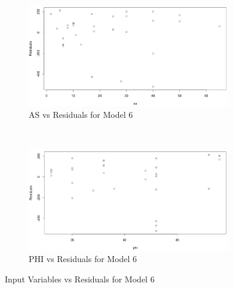 \documentclass[a4paper,12pt, english]{article}
\begin{document}
\begin{figure}[H]
        \centering
        \begin{subfigure}[b]{0.85\textwidth}
                \includegraphics[width=0.96986\textwidth]{mod6-resid1}
   		 \caption{AS vs Residuals for Model 6}
  		\label{fig:mod6-resid1}
        \end{subfigure}%
        ~ %
        
        \begin{subfigure}[b]{0.85\textwidth}
                \centering
  		\includegraphics[width=0.96986\textwidth]{mod6-resid2}
  		\caption{PHI vs Residuals for Model 6}
  		\label{fig:mod6-resid2}
        \end{subfigure}
        
        \caption{Input Variables vs Residuals for Model 6}
        \label{fig:mod6-resids}
\end{figure}
\end{document}
